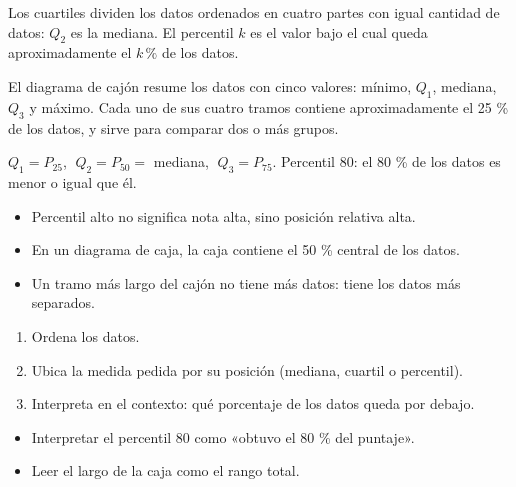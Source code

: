 \documentclass[10pt,a4paper,twocolumn]{article}
\begin{document}
Los cuartiles dividen los datos ordenados en cuatro partes con igual cantidad de datos: $Q_2$ es la mediana. El percentil $k$ es el valor bajo el cual queda aproximadamente el $k\,\%$ de los datos.

El diagrama de cajón resume los datos con cinco valores: mínimo, $Q_1$, mediana, $Q_3$ y máximo. Cada uno de sus cuatro tramos contiene aproximadamente el 25 \% de los datos, y sirve para comparar dos o más grupos.

\begin{definicion}[Definiciones]
$Q_1=P_{25}$, $\;Q_2=P_{50}=$ mediana, $\;Q_3=P_{75}$. Percentil 80: el 80 \% de los datos es menor o igual que él.
\end{definicion}

\begin{ideasclave}
\begin{itemize}
  \item Percentil alto no significa nota alta, sino posición relativa alta.
  \item En un diagrama de caja, la caja contiene el 50 \% central de los datos.
  \item Un tramo más largo del cajón no tiene más datos: tiene los datos más separados.
\end{itemize}
\end{ideasclave}

\begin{metodo}
\begin{enumerate}
  \item Ordena los datos.
  \item Ubica la medida pedida por su posición (mediana, cuartil o percentil).
  \item Interpreta en el contexto: qué porcentaje de los datos queda por debajo.
\end{enumerate}
\end{metodo}

\begin{errorfrecuente}
\begin{itemize}
  \item Interpretar el percentil 80 como «obtuvo el 80 \% del puntaje».
  \item Leer el largo de la caja como el rango total.
\end{itemize}
\end{errorfrecuente}
\end{document}
